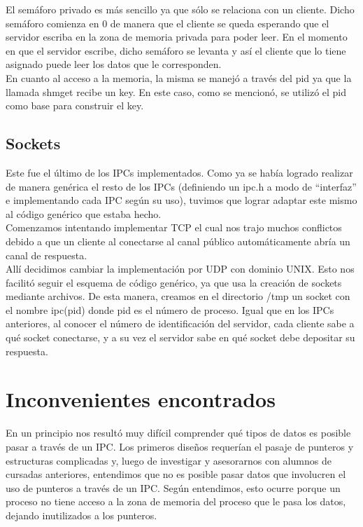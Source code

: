 \documentclass[a4paper, 10pt]{article}
\begin{document}
El semáforo privado es más sencillo ya que sólo se relaciona con un cliente. Dicho semáforo comienza en 0 de manera que el cliente se queda esperando que el servidor escriba en la zona de memoria privada para poder leer. En el momento en que el servidor escribe, dicho semáforo se levanta y así el cliente que lo tiene asignado puede leer los datos que le corresponden.\\

En cuanto al acceso a la memoria, la misma se manejó a través del pid ya que la llamada shmget recibe un key. En este caso, como se mencionó, se utilizó el pid como base para construir el key.\\

\subsection{Sockets}

Este fue el último de los IPCs implementados. Como ya se había logrado realizar de manera genérica el resto de los IPCs (definiendo un ipc.h a modo de “interfaz” e implementando cada IPC según su uso), tuvimos que lograr adaptar este mismo al código genérico que estaba hecho.\\

Comenzamos intentando implementar TCP el cual nos trajo muchos conflictos debido a que un cliente al conectarse al canal público automáticamente abría un canal de respuesta.\\

Allí decidimos cambiar la implementación por UDP con dominio UNIX. Esto nos facilitó seguir el esquema de código genérico, ya que usa la creación de sockets mediante archivos. De esta manera, creamos en el directorio /tmp un socket con el nombre ipc(pid) donde pid es el número de proceso. Igual que en los IPCs anteriores, al conocer el número de identificación del servidor, cada cliente sabe a qué socket conectarse, y a su vez el servidor sabe en qué socket debe depositar su respuesta.\\

\newpage
\section{Inconvenientes encontrados}

En un principio nos resultó muy difícil comprender qué tipos de datos es posible pasar a través de un IPC. Los primeros diseños requerían el pasaje de punteros y estructuras complicadas y, luego de investigar y asesorarnos con alumnos de cursadas anteriores, entendimos que no es posible pasar datos que involucren el uso de punteros a través de un IPC. Según entendimos, esto ocurre porque un proceso no tiene acceso a la zona de memoria del proceso que le pasa los datos, dejando inutilizados a los punteros.\\
\end{document}
